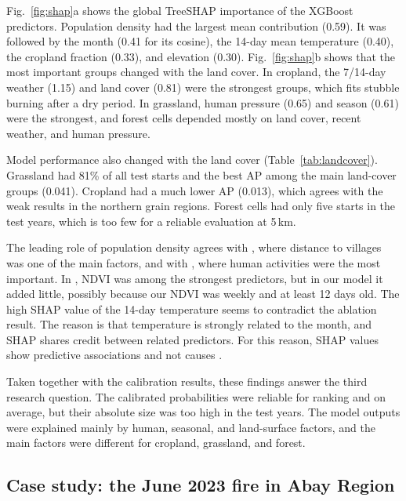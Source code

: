 Fig.~\ref{fig:shap}a shows the global TreeSHAP importance of the XGBoost predictors. Population density had the largest mean contribution (0.59). It was followed by the month (0.41 for its cosine), the 14-day mean temperature (0.40), the cropland fraction (0.33), and elevation (0.30). Fig.~\ref{fig:shap}b shows that the most important groups changed with the land cover. In cropland, the 7/14-day weather (1.15) and land cover (0.81) were the strongest groups, which fits stubble burning after a dry period. In grassland, human pressure (0.65) and season (0.61) were the strongest, and forest cells depended mostly on land cover, recent weather, and human pressure.

Model performance also changed with the land cover (Table~\ref{tab:landcover}). Grassland had 81\% of all test starts and the best AP among the main land-cover groups (0.041). Cropland had a much lower AP (0.013), which agrees with the weak results in the northern grain regions. Forest cells had only five starts in the test years, which is too few for a reliable evaluation at 5\,km.

The leading role of population density agrees with \cite{iban2024shap}, where distance to villages was one of the main factors, and with \cite{bouzeraa2025wsm}, where human activities were the most important. In \cite{jadouli2024morocco}, NDVI was among the strongest predictors, but in our model it added little, possibly because our NDVI was weekly and at least 12 days old. The high SHAP value of the 14-day temperature seems to contradict the ablation result. The reason is that temperature is strongly related to the month, and SHAP shares credit between related predictors. For this reason, SHAP values show predictive associations and not causes \cite{iban2024shap,ouazri2026catboost}.

Taken together with the calibration results, these findings answer the third research question. The calibrated probabilities were reliable for ranking and on average, but their absolute size was too high in the test years. The model outputs were explained mainly by human, seasonal, and land-surface factors, and the main factors were different for cropland, grassland, and forest.

\subsection{Case study: the June 2023 fire in Abay Region}\label{sec:res_case}

